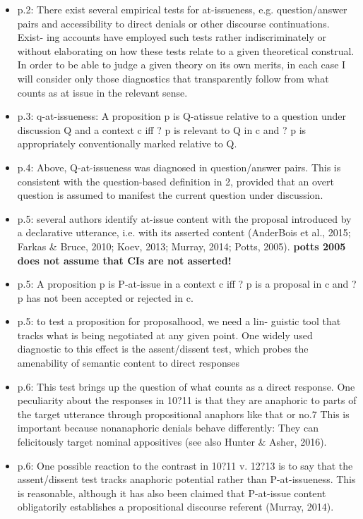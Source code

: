 \documentclass[11pt,fleqn]{article}
\newcommand{\6}{\mbox{$[\hspace*{-.6mm}[$}}
\newcommand{\9}{\mbox{$]\hspace*{-.6mm}]$}}
\begin{document}
\begin{itemize}
\begin{itemize}
\begin{itemize}
\item p.2: There exist several empirical tests for at-issueness, e.g. question/answer pairs and accessibility to direct denials or other discourse continuations. Exist- ing accounts have employed such tests rather indiscriminately or without elaborating on how these tests relate to a given theoretical construal. In order to be able to judge a given theory on its own merits, in each case I will consider only those diagnostics that transparently follow from what counts as at issue in the relevant sense.

\item p.3: q-at-issueness:  A proposition p is Q-atissue relative to a question under discussion Q and a context c iff ? p is relevant to Q in c and
? p is appropriately conventionally marked relative to Q.

\item p.4: Above, Q-at-issueness was diagnosed in question/answer pairs. This is consistent with the question-based definition in 2, provided that an overt question is assumed to manifest the current question under discussion.

\item p.5: several authors identify at-issue content with the proposal introduced by a declarative utterance, i.e. with its asserted content (AnderBois et al., 2015; Farkas \& Bruce, 2010; Koev, 2013; Murray, 2014; Potts, 2005). {\bf potts 2005 does not assume that CIs are not asserted!}

\item p.5: A proposition p is P-at-issue in a context c iff ? p is a proposal in c and ? p has not been accepted or rejected in c.

\item p.5: to test a proposition for proposalhood, we need a lin- guistic tool that tracks what is being negotiated at any given point. One widely used diagnostic to this effect is the assent/dissent test, which probes the amenability of semantic content to direct responses

\item p.6: This test brings up the question of what counts as a direct response. One peculiarity about the responses in 10?11 is that they are anaphoric to parts of the target utterance through propositional anaphors like that or no.7 This is important because nonanaphoric denials behave differently: They can felicitously target nominal appositives (see also Hunter \& Asher, 2016).

\item p.6: One possible reaction to the contrast in 10?11 v. 12?13 is to say that the assent/dissent test tracks anaphoric potential rather than P-at-issueness. This is reasonable, although it has also been claimed that P-at-issue content obligatorily establishes a propositional discourse referent (Murray, 2014).


\end{itemize}
\end{itemize}
\end{itemize}
\end{document}
